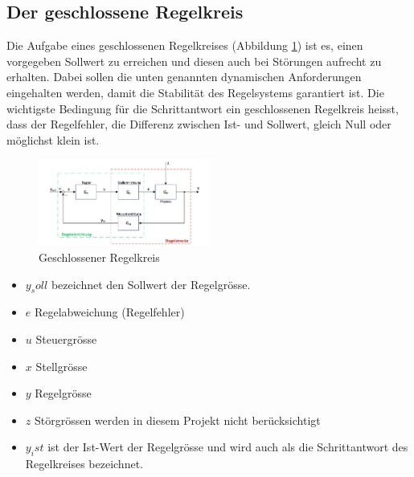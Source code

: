 \subsection{Der geschlossene Regelkreis}
Die Aufgabe eines geschlossenen Regelkreises (Abbildung \ref{fig:geschlossenerRegelkreis}) ist es, einen vorgegeben Sollwert zu erreichen und diesen
auch bei St\"orungen aufrecht zu erhalten. Dabei sollen die unten genannten
dynamischen Anforderungen eingehalten werden, damit die Stabilit\"at des
Regelsystems garantiert ist. Die wichtigste Bedingung f\"ur die Schrittantwort
ein geschlossenen Regelkreis heisst, dass der Regelfehler, die Differenz
zwischen Ist- und Sollwert, gleich Null oder m\"oglichst klein ist.\\


\begin{figure}[!h!, width=\pagewidth]
\begin{center}
\includegraphics[width=0.5\textwidth]{images/geschlRegelkreis}
\caption{Geschlossener Regelkreis}
\label{fig:geschlossenerRegelkreis}
\end{center}
\end{figure}

\begin{itemize}
\item
$y_soll$ bezeichnet den Sollwert der Regelgr\"osse.
\item
$e$ Regelabweichung (Regelfehler)
\item
$u$ Steuergr\"osse
\item
$x$ Stellgr\"osse
\item
$y$ Regelgr\"osse
\item
$z$ St\"orgr\"ossen werden in diesem Projekt nicht berücksichtigt
\item
$y_ist$ ist der Ist-Wert der Regelgr\"osse und wird auch als die
Schrittantwort des Regelkreises bezeichnet.
\end{itemize}


